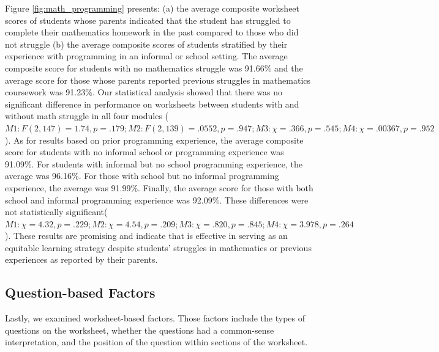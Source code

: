 {Figure \ref{fig:math_programming} presents: (a) the average composite \ts{} worksheet scores of students whose parents indicated that the student has struggled to complete their mathematics homework in the past compared to those who did not struggle (b) the average composite scores of students stratified by their experience with programming in an informal or school setting. The average \ts{} composite score for students with no mathematics struggle was 91.66\% and the average score for those whose parents reported previous struggles in mathematics coursework was 91.23\%. Our statistical analysis showed that there was no significant difference in performance on \ts{} worksheets between students with and without math struggle in all four modules (\begin{math}M1: F(2, 147)=1.74, p=.179; M2: F(2,139)=.0552, p=.947; M3: \chi=.366, p=.545; M4: \chi=.00367, p=.952\end{math}). As for results based on prior programming experience, the average \ts{} composite score for students with no informal school or programming experience was 91.09\%. For students with informal but no school programming experience, the average was 96.16\%. For those with school but no informal programming experience, the average was 91.99\%. Finally, the average score for those with both school and informal programming experience was 92.09\%. These differences were not statistically significant(\begin{math}M1: \chi=4.32, p=.229; M2: \chi=4.54, p=.209; M3: \chi=.820, p=.845; M4: \chi=3.978, p=.264\end{math}). These results are promising and indicate that \ts{} is effective in serving as an equitable learning strategy despite students' struggles in mathematics or previous experiences as reported by their parents.

\subsection{Question-based Factors}
 \label{qb-factors}
 
Lastly, we examined worksheet-based factors. Those factors include the types of questions on the worksheet, whether the questions had a common-sense interpretation, and the position of the question within sections of the worksheet. 
 

}
